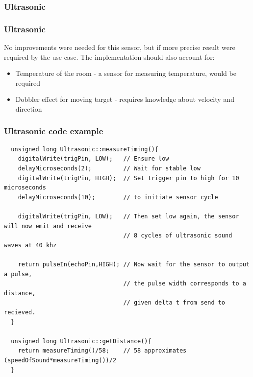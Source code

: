 \subsubsection{Ultrasonic}
\begin{frame}
	\frametitle{Ultrasonic}
	No improvements were needed for this sensor, but if more precise result were required by the use case.
	The implementation should also account for:
	\begin{itemize}
    \item Temperature of the room - a sensor for measuring temperature, would be required
    \item Dobbler effect for moving target - requires knowledge about velocity and direction
	\end{itemize}
\end{frame}
\begin{frame}[fragile]
	\frametitle{Ultrasonic code example}
	\begin{lstlisting}   
  unsigned long Ultrasonic::measureTiming(){
    digitalWrite(trigPin, LOW);   // Ensure low
    delayMicroseconds(2);         // Wait for stable low
    digitalWrite(trigPin, HIGH);  // Set trigger pin to high for 10 microseconds
    delayMicroseconds(10);        // to initiate sensor cycle

    digitalWrite(trigPin, LOW);   // Then set low again, the sensor will now emit and receive
                                  // 8 cycles of ultrasonic sound waves at 40 khz

    return pulseIn(echoPin,HIGH); // Now wait for the sensor to output a pulse,
                                  // the pulse width corresponds to a distance,
                                  // given delta t from send to recieved.
  }
  
  unsigned long Ultrasonic::getDistance(){
    return measureTiming()/58;    // 58 approximates (speedOfSound*measureTiming())/2
  }
	\end{lstlisting}
\end{frame}
